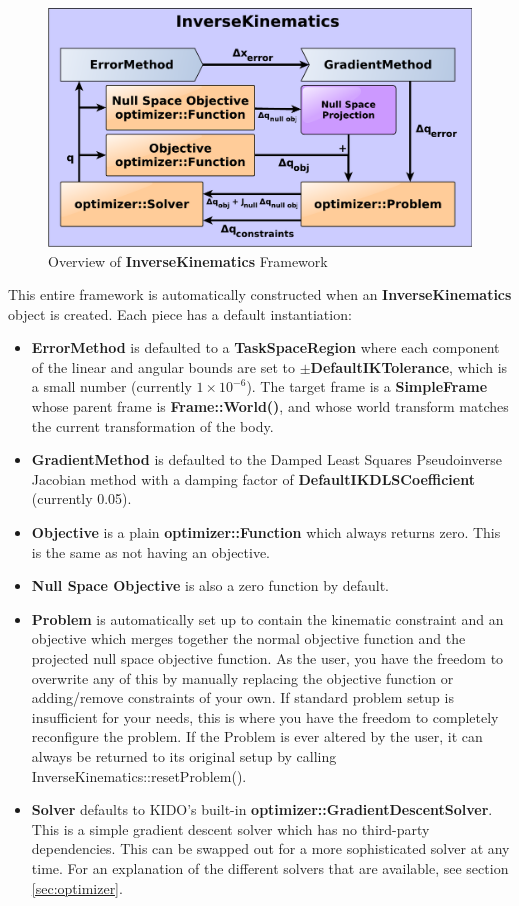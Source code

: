 \begin{figure}
\centering
\includegraphics[width=\textwidth]{fig/ik_diagram.pdf}
\caption{Overview of \textbf{InverseKinematics} Framework}
\label{fig:ik_basic_framework}
\end{figure}

This entire framework is automatically constructed when an \textbf{InverseKinematics} object is created. Each piece has a default instantiation:

\begin{itemize}
  \item \textbf{ErrorMethod} is defaulted to a \textbf{TaskSpaceRegion} where each component of the linear and angular bounds are set to $\pm$\textbf{DefaultIKTolerance}, which is a small number (currently $1\times 10^{-6}$). The target frame is a \textbf{SimpleFrame} whose parent frame is \textbf{Frame::World()}, and whose world transform matches the current transformation of the body.
  \item \textbf{GradientMethod} is defaulted to the Damped Least Squares Pseudoinverse Jacobian method with a damping factor of \textbf{DefaultIKDLSCoefficient} (currently 0.05).
  \item \textbf{Objective} is a plain \textbf{optimizer::Function} which always returns zero. This is the same as not having an objective.
  \item \textbf{Null Space Objective} is also a zero function by default.
  \item \textbf{Problem} is automatically set up to contain the kinematic constraint and an objective which merges together the normal objective function and the projected null space objective function. As the user, you have the freedom to overwrite any of this by manually replacing the objective function or adding/remove constraints of your own. If standard problem setup is insufficient for your needs, this is where you have the freedom to completely reconfigure the problem. If the Problem is ever altered by the user, it can always be returned to its original setup by calling InverseKinematics::resetProblem().
  \item \textbf{Solver} defaults to KIDO's built-in \textbf{optimizer::GradientDescentSolver}. This is a simple gradient descent solver which has no third-party dependencies. This can be swapped out for a more sophisticated solver at any time. For an explanation of the different solvers that are available, see section \ref{sec:optimizer}.
\end{itemize}

